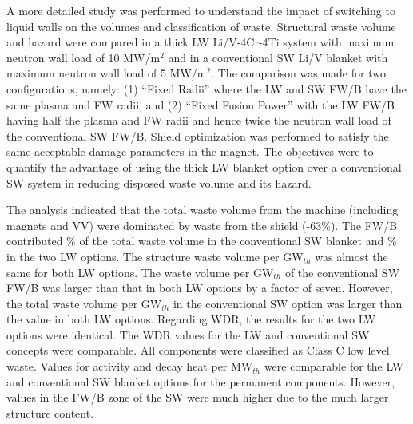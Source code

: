A more detailed study was performed to understand the impact of switching to
liquid walls on the volumes and classification of waste.  Structural waste
volume and hazard were compared in a thick \gls{LW} Li/V-4Cr-4Ti system with
maximum neutron wall load of 10 MW/m$^2$ and in a conventional \gls{SW} Li/V
blanket with maximum neutron wall load of 5 MW/m$^2$. The comparison was made
for two configurations, namely: (1) “Fixed Radii” where the \gls{LW} and
\gls{SW} \gls{FW/B} have the same plasma and FW radii, and (2) “Fixed Fusion
Power” with the \gls{LW} \gls{FW/B} having half the plasma and \gls{FW} radii
and hence twice the neutron wall load of the conventional \gls{SW}
\gls{FW/B}. Shield optimization was performed to satisfy the same acceptable
damage parameters in the magnet. The objectives were to quantify the advantage
of using the thick \gls{LW} blanket option over a conventional \gls{SW} system
in reducing disposed waste volume and its hazard.

The analysis indicated that the total waste volume from the machine (including
magnets and \gls{VV}) were dominated by waste from the shield (-63\%). The \gls{FW/B} contributed \% of the total waste
volume in the conventional \gls{SW} blanket and \% in the two
\gls{LW} options. The structure waste volume per GW$_{th}$ was almost the same
for both \gls{LW} options. The waste volume per GW$_{th}$ of the conventional
\gls{SW} \gls{FW/B} was larger than that in both \gls{LW} options by a factor
of seven. However, the total waste volume per GW$_{th}$ in the conventional
\gls{SW} option was  larger than the value in both \gls{LW}
options. Regarding \gls{WDR}, the results for the two \gls{LW} options were
identical. The \gls{WDR} values for the \gls{LW} and conventional \gls{SW}
concepts were comparable. All components were classified as Class C low level
waste. Values for activity and decay heat per MW$_{th}$ were comparable for
the \gls{LW} and conventional \gls{SW} blanket options for the permanent
components. However, values in the \gls{FW/B} zone of the \gls{SW} were much
higher due to the much larger structure
content.

